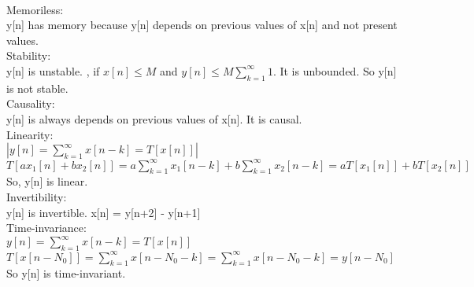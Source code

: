 \documentclass[10pt,a4paper, margin=1in]{article}
\begin{document}
\begin{enumerate}
\begin{enumerate}
    \ \\
    Memoriless:\\
    
    y[n] has memory because y[n] depends on previous values of x[n] and not present values.\\
    
    Stability: \\
    
	y[n] is unstable. , if $x[n] \le M$ and $y[n] \le M \sum_{k=1}^{\infty} 1$. It is unbounded. So y[n] is not stable.\\
    
    Causality:\\
    
    y[n] is always depends  on previous values of x[n]. It is causal. \\
    
    Linearity:\\
    
    $|y[n] = \sum_{k=1}^{\infty}x[n-k] = T[x[n]]|$\\
    $T[ax_1[n] + bx_2[n]] = a\sum_{k=1}^{\infty}x_1[n-k] + b\sum_{k=1}^{\infty}x_2[n-k] = aT[x_1[n]] + bT[x_2[n]]$\\
    So, y[n] is linear.\\
    
    Invertibility:\\
    
    y[n] is invertible. x[n] = y[n+2] - y[n+1] \\
    
    Time-invariance:\\
    
    $y[n] = \sum_{k=1}^{\infty}x[n-k] = T[x[n]]$\\
    $T[x[n-N_0]] =\sum_{k=1}^{\infty}x[n- N_0 -k] = \sum_{k=1}^{\infty}x[n - N_0 -k] = y[n - N_0]$\\
    So y[n] is time-invariant. \\
    
    
    \end{enumerate}

\end{enumerate}
\end{document}
